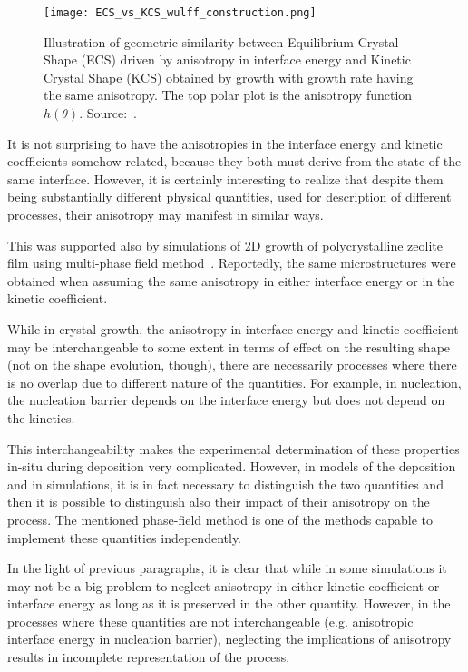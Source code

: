 \begin{figure}
	\centering
	\texttt{[image: ECS\_vs\_KCS\_wulff\_construction.png]}
	\caption[Illustration of geometric similarity between Equilibrium Crystal Shape and Kinetic Crystal Shape]{Illustration of geometric similarity between Equilibrium Crystal Shape (ECS) driven by anisotropy in interface energy and Kinetic Crystal Shape (KCS) obtained by growth with growth rate having the same anisotropy. The top polar plot is the anisotropy function $h(\theta)$. Source:~\cite{Salvalaglio2015}.}
	\label{fig_ECS_vs_KCS_wulff_construction}
\end{figure}

It is not surprising to have the anisotropies in the interface energy and kinetic coefficients somehow related, because they both must derive from the state of the same interface. However, it is certainly interesting to realize that despite them being substantially different physical quantities, used for description of different processes, their anisotropy may manifest in similar ways. 

This was supported also by simulations of 2D growth of polycrystalline zeolite film using multi-phase field method~\cite{Wendler2011}. Reportedly, the same microstructures were obtained when assuming the same anisotropy in either interface energy or in the kinetic coefficient. 

While in crystal growth, the anisotropy in interface energy and kinetic coefficient may be interchangeable to some extent in terms of effect on the resulting shape (not on the shape evolution, though), there are necessarily processes where there is no overlap due to different nature of the quantities. For example, in nucleation, the nucleation barrier depends on the interface energy but does not depend on the kinetics. 

This interchangeability makes the experimental determination of these properties in-situ during deposition very complicated. However, in models of the deposition and in simulations, it is in fact necessary to distinguish the two quantities and then it is possible to distinguish also their impact of their anisotropy on the process. The mentioned phase-field method is one of the methods capable to implement these quantities independently.

In the light of previous paragraphs, it is clear that while in some simulations it may not be a big problem to neglect anisotropy in either kinetic coefficient or interface energy as long as it is preserved in the other quantity. However, in the processes where these quantities are not interchangeable (e.g. anisotropic interface energy in nucleation barrier), neglecting the implications of anisotropy results in incomplete representation of the process.

